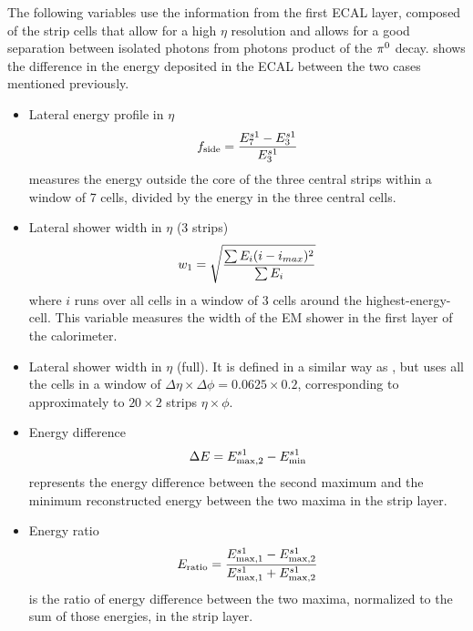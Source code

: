 The following variables use the information from the first \ac{ECAL} layer, composed of the strip cells that allow for a high \(\eta\) resolution and allows for a good separation between isolated photons from photons product of the \(\pi^{0}\) decay. \Fig{\ref{fig:pid_ss:ss:pizero}} shows the difference in the energy deposited in the \ac{ECAL} between the two cases mentioned previously.
\begin{itemize}
    \item Lateral energy profile in \(\eta\)
        \begin{equation}
            f_{\text{side}} = \frac{E_7^{s1} - E_3^{s1}}{E_3^{s1}}
        \end{equation}
        measures the energy outside the core of the three central strips within a window of 7 cells, divided by the energy in the three central cells.
    \item Lateral shower width in \(\eta\) (3 strips)
        \begin{equation}
            w_{1} = \sqrt{
                \frac{\sum E_i (i - i_{max})^2}{\sum E_i}
            }
        \end{equation}
        where \(i\) runs over all cells in a window of 3 cells around the highest-energy-cell. This variable measures the width of the \ac{EM} shower in the first layer of the calorimeter.
    \item Lateral shower width in \(\eta\) (full).
        It is defined in a similar way as \wone, but uses all the cells in a window of \(\Delta\eta\times\Delta\phi=0.0625\times 0.2\), corresponding to approximately to \(20\times 2\) strips \(\eta\times\phi\).
    \item Energy difference
        \begin{equation}
            \Delta E = E_{\text{max}, 2}^{s1} - E_{\text{min}}^{s1}
        \end{equation}
        represents the energy difference between the second maximum and the minimum reconstructed energy between the two maxima in the strip layer.
    \item Energy ratio
        \begin{equation}
            E_{\text{ratio}} = \frac{
                E_{\text{max}, 1}^{s1} - E_{\text{max}, 2}^{s1}
            }{
                E_{\text{max}, 1}^{s1} + E_{\text{max}, 2}^{s1}
            }
        \end{equation}
        is the ratio of energy difference between the two maxima, normalized to the sum of those energies, in the strip layer.
\end{itemize}

